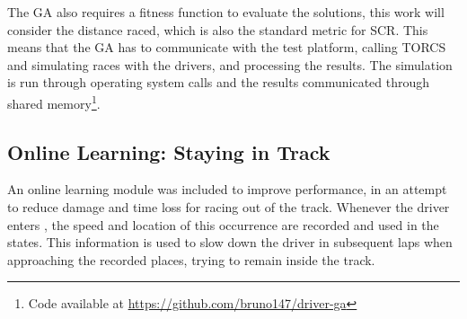 The GA also requires a fitness function to evaluate the solutions, this work will consider the distance raced, which is also the standard metric for SCR. This means that the GA has to communicate with the test platform, calling  TORCS and simulating races with the drivers, and processing the results. The simulation is run through operating system calls and the results communicated through shared memory\footnote{Code available at \url{https://github.com/bruno147/driver-ga}}.

\subsection{Online Learning: Staying in Track}%

An online learning module was included to improve performance, in an attempt to reduce damage and time loss for racing out of the track. Whenever the driver enters \OT, the speed and location of this occurrence are recorded and used in the  states. This information is used to slow down the driver in subsequent laps when approaching the recorded places, trying to remain inside the track.

